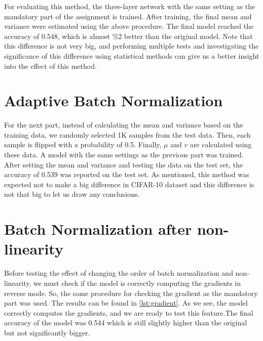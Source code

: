 \documentclass[a4paper]{article}
\begin{document}
For evaluating this method, the three-layer network with the same setting as the mandatory part of the assignment is trained. After training, the final mean and variance were estimated using the above procedure. The final model reached the accuracy of 0.548, which is almost \%2 better than the original model. Note that this difference is not very big, and performing multiple tests and investigating the significance of this difference using statistical methods can give us a better insight into the effect of this method.


\section{Adaptive Batch Normalization}

For the next part, instead of calculating the mean and variance based on the training data, we randomly selected 1K samples from the test data. Then, each sample is flipped with a probability of 0.5. Finally, $\mu$ and $v$ are calculated using these data. 
A model with the same settings as the previous part was trained. After setting the mean and variance and testing the data on the test set, the accuracy of 0.539 was reported on the test set. As mentioned, this method was expected not to make a big difference in CIFAR-10 dataset and this difference is not that big to let us draw any conclusions.

\section{Batch Normalization after non-linearity}

Before testing the effect of changing the order of batch normalization and non-linearity, we must check if the model is correctly computing the gradients in reverse mode. So, the same procedure for checking the gradient as the mandatory part was used. The results can be found in \autoref{lst:gradient}. As we see, the model correctly computes the gradients, and we are ready to test this feature.The final accuracy of the model was 0.544 which is still slightly higher than the original but not significantly bigger.
\end{document}
